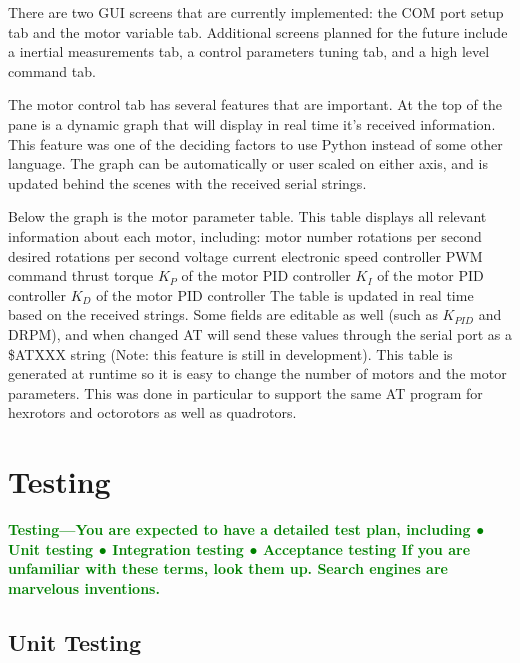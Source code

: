 \documentclass{article}
\numberwithin{equation}{section} %
\begin{document}
There are two GUI screens that are currently implemented: the COM port setup tab and the motor variable tab. Additional screens planned for the future include a inertial measurements tab, a control parameters tuning tab, and a high level command tab.

The motor control tab has several features that are important. At the top of the pane is a dynamic graph that will display in real time it's received information. This feature was one of the deciding factors to use Python instead of some other language. The graph can be automatically or user scaled on either axis, and is updated behind the scenes with the received serial strings.

Below the graph is the motor parameter table. This table displays all relevant information about each motor, including: 
motor number
rotations per second
desired rotations per second
voltage
current
electronic speed controller PWM command
thrust
torque
$K_P$ of the motor PID controller
$K_I$ of the motor PID controller
$K_D$ of the motor PID controller
The table is updated in real time based on the received strings. Some fields are editable as well (such as $K_{PID}$ and DRPM), and when changed AT will send these values through the serial port as a \$ATXXX string (Note: this feature is still in development). This table is generated at runtime so it is easy to change the number of motors and the motor parameters. This was done in particular to support the same AT program for hexrotors and octorotors as well as quadrotors.




\section{Testing}
\textcolor{green}{\bf Testing—You are expected to have a detailed test plan, including 
● Unit testing
● Integration testing
● Acceptance testing
If you are unfamiliar with these terms, look them up. Search engines are marvelous 
inventions.}

\subsection{Unit Testing}
\end{document}
